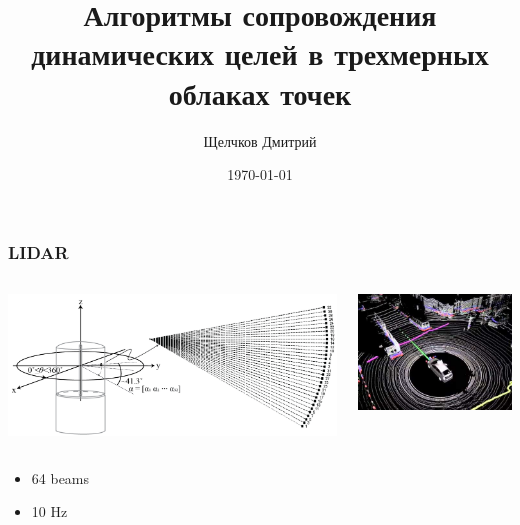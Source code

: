 \documentclass[xcolor=table,usenames,dvipsnames]{beamer}
\title[АСДЦвТОЧ]{Алгоритмы сопровождения динамических целей в трехмерных облаках точек} %
\date{\today} %
\author{Щелчков Дмитрий}
\institute[]{Научный руководитель: Алексей Артёмов}
\begin{document}
\begin{frame}
\titlepage %
\end{frame}


\begin{frame}
\frametitle{LIDAR}
\begin{columns}
\begin{column}{0.5\textwidth}
\includegraphics[width=\textwidth, height=0.5\textheight]{img/lidar.png}
\end{column}
\begin{column}{0.5\textwidth}
\includegraphics[width=\textwidth, height=0.5\textheight]{img/lidar_data.jpg}
\end{column}
\end{columns}
\begin{itemize}
\item 64 beams
\item 10 Hz
\end{itemize}
\end{frame}
\end{document}
